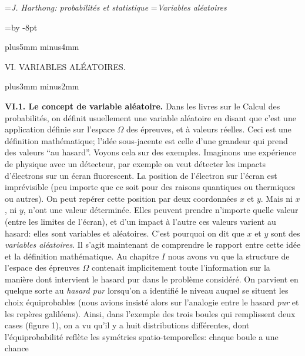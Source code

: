 


\auteurcourant={\sl J. Harthong: probabilit\'es et statistique}
\titrecourant={\sl Variables al\'eatoires}


\newdimen\blocksize  \blocksize=\vsize \advance\blocksize by -8pt
\def\struta{\vrule depth1.8pt width0pt}
\def\strutb{\vrule height7.5pt width0pt}
\def\ata{\hskip-2.5pt}
\def\aub{\hskip1pt}

\null\vskip10mm plus5mm minus4mm

\centerline{\tit VI.  VARIABLES AL\'EATOIRES.}

\vskip10mm plus3mm minus2mm

{\bf VI.\aub 1. Le concept de variable al\'eatoire.}
\medskip
Dans les livres sur le Calcul des probabilit\'es, on d\'efinit usuellement 
une variable al\'eatoire en disant que c'est une application d\'efinie sur
l'espace $\Omega$ des \'epreuves, et \`a valeurs r\'eelles.
\medskip
Ceci est une d\'efinition math\'ematique; l'id\'ee sous-jacente est celle 
d'une grandeur qui prend des valeurs ``au hasard''. Voyons cela sur des
exemples. Imaginons une exp\'erience de physique avec un d\'etecteur, 
par exemple on veut d\'etecter les impacts d'\'electrons sur un \'ecran
fluorescent. La position de l'\'electron sur l'\'ecran est impr\'evisible 
(peu importe que ce soit pour des raisons quantiques ou thermiques ou
autres). On peut rep\'erer cette position par deux coordonn\'ees $x$ et
$y$. Mais ni $x$, ni $y$, n'ont une valeur d\'etermin\'ee. Elles peuvent
prendre n'importe quelle valeur (entre les limites de l'\'ecran), et d'un
impact \`a l'autre ces valeurs varient au hasard: elles sont variables et
al\'eatoires. C'est pourquoi on dit que $x$ et $y$ sont des {\it variables
al\'eatoires}. Il s'agit maintenant de comprendre le rapport entre cette
id\'ee et la d\'efinition math\'ematique. 
\medskip
Au chapitre $I$ nous avons vu que la structure de l'espace des \'epreuves
$\Omega$ contenait implicitement  toute l'information sur la mani\`ere 
dont intervient le hasard pur dans le probl\`eme consid\'er\'e. On parvient
en quelque sorte au {\it hasard pur} lorsqu'on a identifi\'e le niveau 
auquel se situent les choix \'equiprobables (nous avions insist\'e alors
sur l'analogie entre le hasard {\it pur} et les rep\`eres galil\'eens). Ainsi,
dans l'exemple des trois boules qui remplissent deux cases (figure 1), on
a vu qu'il y a  huit distributions diff\'erentes, dont l'\'equiprobabilit\'e
refl\`ete les sym\'etries spatio-temporelles: chaque boule a une chance 
